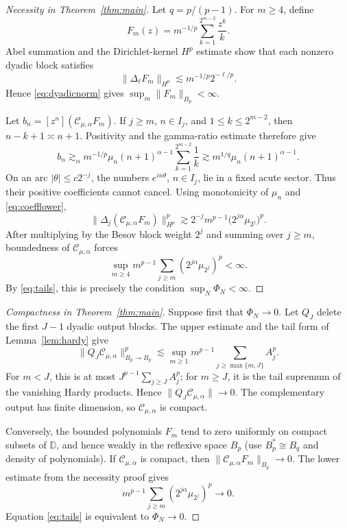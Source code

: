 \documentclass[11pt]{article}
\newcommand{\D}{\mathbb D}
\newcommand{\Cma}{\mathcal C_{\mu,\alpha}}
\begin{document}
\begin{proof}[Necessity in Theorem~\ref{thm:main}]
Let \(q=p/(p-1)\).  For \(m\geq4\), define
\[
 F_m(z)=m^{-1/p}\sum_{k=1}^{2^{m-2}}\frac{z^k}{k}.
\]
Abel summation and the Dirichlet-kernel \(H^p\) estimate show that each
nonzero dyadic block satisfies
\[
 \|\Delta_\ell F_m\|_{H^p}
 \lesssim m^{-1/p}2^{-\ell/p}.
\]
Hence \eqref{eq:dyadicnorm} gives
\(\sup_m\|F_m\|_{B_p}<\infty\).

Let \(b_n=[z^n](\Cma F_m)\).  If \(j\geq m\), \(n\in I_j\), and
\(1\leq k\leq2^{m-2}\), then \(n-k+1\asymp n+1\).  Positivity and the
gamma-ratio estimate therefore give
\begin{equation}\label{eq:coefflower}
 b_n\gtrsim_{\alpha}
 m^{-1/p}\mu_n(n+1)^{\alpha-1}
 \sum_{k=1}^{2^{m-2}}\frac1k
 \gtrsim m^{1/q}\mu_n(n+1)^{\alpha-1}.
\end{equation}
On an arc \(|\theta|\leq c2^{-j}\), the numbers
\(e^{in\theta}\), \(n\in I_j\), lie in a fixed acute sector.  Thus their
positive coefficients cannot cancel.  Using monotonicity of \(\mu_n\) and
\eqref{eq:coefflower},
\[
 \|\Delta_j(\Cma F_m)\|_{H^p}^p
 \gtrsim
 2^{-j}m^{p-1}
 \bigl(2^{j\alpha}\mu_{2^j}\bigr)^p.
\]
After multiplying by the Besov block weight \(2^j\) and summing over
\(j\geq m\), boundedness of \(\Cma\) forces
\[
 \sup_{m\geq4}m^{p-1}
 \sum_{j\geq m}(2^{j\alpha}\mu_{2^j})^p<\infty.
\]
By \eqref{eq:tails}, this is precisely the condition
\(\sup_N\Phi_N<\infty\).
\end{proof}

\begin{proof}[Compactness in Theorem~\ref{thm:main}]
Suppose first that \(\Phi_N\to0\).  Let \(Q_J\) delete the first \(J-1\)
dyadic output blocks.  The upper estimate and the tail form of
Lemma~\ref{lem:hardy} give
\[
 \|Q_J\Cma\|_{B_p\to B_p}^p
 \lesssim
 \sup_{m\geq1}m^{p-1}
 \sum_{j\geq\max\{m,J\}}A_j^p.
\]
For \(m<J\), this is at most
\(J^{p-1}\sum_{j\geq J}A_j^p\); for \(m\geq J\), it is the tail supremum
of the vanishing Hardy products.  Hence \(\|Q_J\Cma\|\to0\).  The
complementary output has finite dimension, so \(\Cma\) is compact.

Conversely, the bounded polynomials \(F_m\) tend to zero uniformly on compact
subsets of \(\D\), and hence weakly in the reflexive space \(B_p\) (use
\(B_p^*\cong B_q\) and density of polynomials).  If \(\Cma\) is compact,
then \(\|\Cma F_m\|_{B_p}\to0\).  The lower estimate from the necessity
proof gives
\[
 m^{p-1}\sum_{j\geq m}(2^{j\alpha}\mu_{2^j})^p\longrightarrow0.
\]
Equation \eqref{eq:tails} is equivalent to \(\Phi_N\to0\).
\end{proof}
\end{document}
